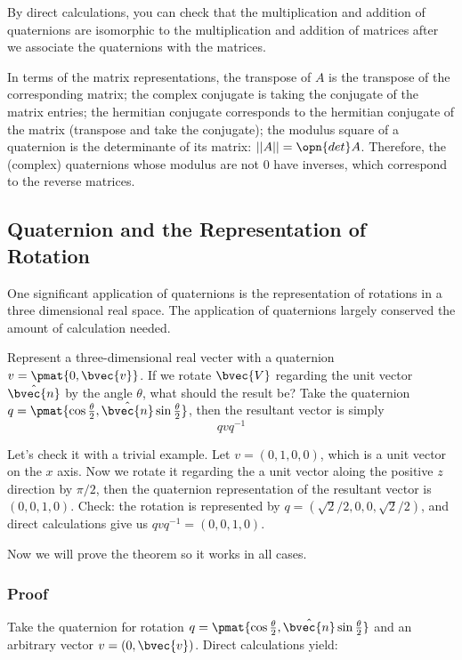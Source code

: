 By direct calculations, you can check that the multiplication and addition of quaternions are isomorphic to the multiplication and addition of matrices after we associate the quaternions with the matrices.  

In terms of the matrix representations, the transpose of $A$ is the transpose of the corresponding matrix; the complex conjugate is taking the conjugate of the matrix entries; the hermitian conjugate corresponds to the hermitian conjugate of the matrix (transpose and take the conjugate); the modulus square of a quaternion is the determinante of its matrix: $||A||=\opn{det}A$. Therefore, the (complex) quaternions whose modulus are not $0$ have inverses, which correspond to the reverse matrices. 


\subsection{Quaternion and the Representation of Rotation}

One significant application of quaternions is the representation of rotations in a three dimensional real space. The application of quaternions largely conserved the amount of calculation needed. 

Represent a three-dimensional real vecter with a quaternion $v=\pmat{0, \bvec{v}}$. If we rotate $\bvec{V}$ regarding the unit vector $\hat{\bvec{n}}$ by the angle $\theta$, what should the result be? Take the quaternion $q=\pmat{\cos{\frac{\theta}{2}}, \hat{\bvec{n}}\sin{\frac{\theta}{2}}}$, then the resultant vector is simply
\begin{equation}
qvq^{-1}
\end{equation}

Let's check it with a trivial example. Let $v=(0, 1, 0, 0)$, which is a unit vector on the $x$ axis. Now we rotate it regarding the a unit vector aloing the positive $z$ direction by $\pi/2$, then the quaternion representation of the resultant vector is$(0, 0, 1, 0)$. Check: the rotation is represented by $q=(\sqrt{2}/2, 0, 0, \sqrt{2}/2)$, and direct calculations give us $qvq^{-1}=(0,0,1,0)$. 

Now we will prove the theorem so it works in all cases. 

\subsubsection{Proof}

Take the quaternion for rotation $q=\pmat{\cos{\frac{\theta}{2}}, \hat{\bvec{n}}\sin{\frac{\theta}{2}}}$ and an arbitrary vector $v=(0, \bvec{v})$. Direct calculations yield: 


